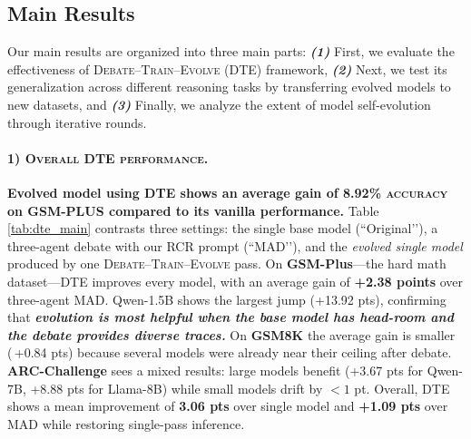 \documentclass[11pt]{article}
\begin{document}
\subsection{Main Results}
Our main results are organized into three main parts: \textbf{\textit{(1)}} First, we evaluate the effectiveness of \textsc{Debate--Train--Evolve (DTE)} framework, \textbf{\textit{(2)}} Next, we test its generalization across different reasoning tasks by transferring evolved models to new datasets, and \textbf{\textit{(3)}} Finally, we analyze the extent of model self-evolution through iterative rounds. 

\paragraph{\textsc{1) Overall DTE performance.}} \textbf{Evolved model using \textsc{DTE} shows an average gain of \textsc{8.92\% accuracy} on GSM-PLUS compared to its vanilla performance.} Table \ref{tab:dte_main} contrasts three settings: the single base model (``Original’’), a three-agent debate with our RCR prompt (``MAD’’), and the \emph{evolved single model} produced by one \textsc{Debate–Train–Evolve} pass. On \textbf{GSM-Plus}—the hard math dataset—DTE improves every model, with an average gain of \textbf{+2.38 points} over three-agent MAD. Qwen-1.5B shows the largest jump (+13.92 pts), confirming that \textbf{\textit{evolution is most helpful when the base model has head-room and the debate provides diverse traces.}} On \textbf{GSM8K} the average gain is smaller (\,+0.84 pts) because several models were already near their ceiling after debate. \textbf{ARC-Challenge} sees a mixed results: large models benefit (+3.67 pts for Qwen-7B, +8.88 pts for Llama-8B) while small models drift by $<1$ pt. Overall, DTE shows a mean improvement of \textbf{3.06 pts} over single model and \textbf{+1.09 pts} over MAD while restoring single-pass inference.
\end{document}
